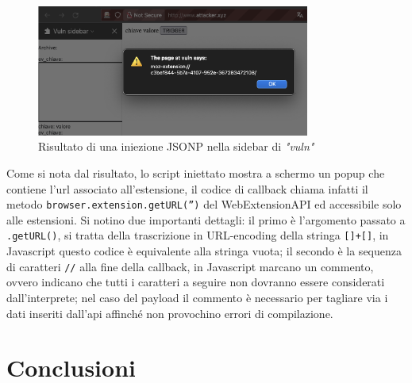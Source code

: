 \documentclass{sapthesis}
\newcommand{\code}[1]{\texttt{#1}}
\newcommand{\method}[1]{\code{.#1()}}
\newcommand{\vuln}{\textit{"vuln"}}
\newcommand{\JS}{Javascript}
\begin{document}
                \begin{figure}[ht]
                    \centering
                    \includegraphics[width=0.8\textwidth]{sidebar-jsonp-injection.png}
                    \caption{Risultato di una iniezione JSONP nella sidebar di \vuln{}}
                    \label{fig:sidebar-jsonp-injection}
                \end{figure}

                Come si nota dal risultato, lo script iniettato mostra a schermo un popup
                che contiene l'url associato all'estensione, il codice di callback chiama
                infatti il metodo \code{browser.extension.getURL('')} del WebExtensionAPI
                ed accessibile solo alle estensioni. Si notino due importanti dettagli:
                il primo è l'argomento passato a \method{getURL}, si tratta della trascrizione
                in URL-encoding della stringa \code{[]+[]}, in \JS{} questo codice è equivalente
                alla stringa vuota; il secondo è la sequenza di caratteri \code{//} alla fine della
                callback, in \JS{} marcano un commento, ovvero indicano che tutti i caratteri
                a seguire non dovranno essere considerati dall'interprete; nel caso del payload
                il commento è necessario per tagliare via i dati inseriti dall'api affinché
                non provochino errori di compilazione.\\








\chapter{Conclusioni}


\printbibliography
\end{document}
